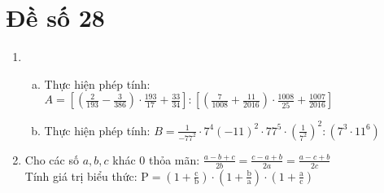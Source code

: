 \section{Đề số 28}

\begin{bt} 
   \hfill
   \begin{enumerate}[1.]
    \item \begin{enumerate}[a.]
        \item Thực hiện phép tính: $A=\left[\left(\frac{2}{193}-\frac{3}{386}\right) \cdot \frac{193}{17}+\frac{33}{34}\right]:\left[\left(\frac{7}{1008}+\frac{11}{2016}\right) \cdot \frac{1008}{25}+\frac{1007}{2016}\right]$
        \item Thực hiện phép tính: $B=\frac{1}{-77^2} \cdot 7^4(-11)^2 \cdot 77^5 \cdot\left(\frac{1}{7^2}\right)^2:\left(7^3 \cdot 11^6\right)$
    \end{enumerate}  
    \item Cho các số $a, b, c$ khác 0 thỏa mãn: $\frac{a-b+c}{2 b}=\frac{c-a+b}{2 a}=\frac{a-c+b}{2 c}$\\[5px]
    Tính giá trị biểu thức: $\mathrm{P}=\left(1+\frac{\mathrm{c}}{\mathrm{b}}\right) \cdot\left(1+\frac{\mathrm{b}}{\mathrm{a}}\right) \cdot\left(1+\frac{\mathrm{a}}{\mathrm{c}}\right)$
   \end{enumerate}
\end{bt}

